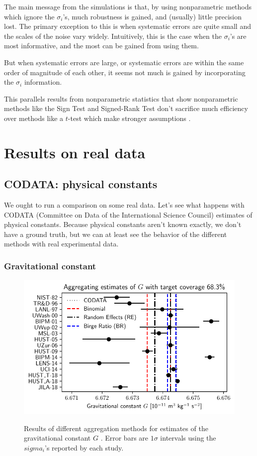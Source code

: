 \documentclass[12pt]{article}
\begin{document}
The main message from the simulations is that, by using nonparametric methods which ignore the $\sigma_i$'s, much robustness is gained, and (usually) little precision lost. The primary exception to this is when systematic errors are quite small and the scales of the noise vary widely. Intuitively, this is the case when the $\sigma_i$'s are most informative, and the most can be gained from using them.

But when systematic errors are large, or systematic errors are within the same order of magnitude of each other, it seems not much is gained by incorporating the $\sigma_i$ information.

This parallels results from nonparametric statistics that show nonparametric methods like the Sign Test and Signed-Rank Test don't sacrifice much efficiency over methods like a $t$-test which make stronger assumptions \citep{conover1999practical}.

\section{Results on real data}\label{results-on-real-data}

\subsection{CODATA: physical constants}\label{codata-physical-constants}

We ought to run a comparison on some real data. Let's see what happens with CODATA (Committee on Data of the International Science Council) estimates of physical constants. Because physical constants aren't known exactly, we don't have a ground truth, but we can at least see the behavior of the different methods with real experimental data.

\subsubsection{Gravitational constant}\label{gravitational-constant}

\begin{figure}[H]
\centering
\includegraphics[width=\textwidth]{figs/G0.pdf}
\label{fig:G}
\caption{Results of different aggregation methods for estimates of the gravitational constant $G$ \cite[Table XXIX]{tiesinga2021codata}. Error bars are $1\sigma$ intervals using the $sigma_i$'s reported by each study.}
\end{figure}
\end{document}
